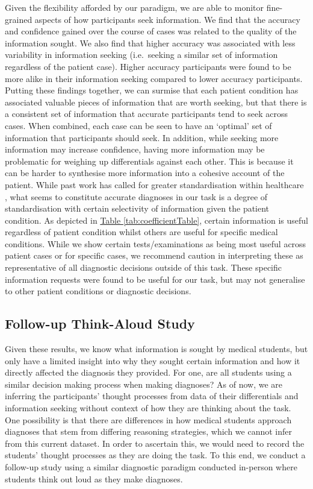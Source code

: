 \documentclass[a4paper, nobind]{templates/ociamthesis}
\begin{document}
Given the flexibility afforded by our paradigm, we are able to monitor fine-grained aspects of how participants seek information. We find that the accuracy and confidence gained over the course of cases was related to the quality of the information sought. We also find that higher accuracy was associated with less variability in information seeking (i.e.~seeking a similar set of information regardless of the patient case). Higher accuracy participants were found to be more alike in their information seeking compared to lower accuracy participants. Putting these findings together, we can surmise that each patient condition has associated valuable pieces of information that are worth seeking, but that there is a consistent set of information that accurate participants tend to seek across cases. When combined, each case can be seen to have an `optimal' set of information that participants should seek. In addition, while seeking more information may increase confidence, having more information may be problematic for weighing up differentials against each other. This is because it can be harder to synthesise more information into a cohesive account of the patient. While past work has called for greater standardisation within healthcare \autocite{wears_standardisation_2015}, what seems to constitute accurate diagnoses in our task is a degree of standardisation with certain selectivity of information given the patient condition. As depicted in \hyperref[tab:coefficientTable]{Table \ref{tab:coefficientTable}}, certain information is useful regardless of patient condition whilst others are useful for specific medical conditions. While we show certain tests/examinations as being most useful across patient cases or for specific cases, we recommend caution in interpreting these as representative of all diagnostic decisions outside of this task. These specific information requests were found to be useful for our task, but may not generalise to other patient conditions or diagnostic decisions.

\subsection{Follow-up Think-Aloud Study}\label{follow-up-think-aloud-study}

Given these results, we know what information is sought by medical students, but only have a limited insight into why they sought certain information and how it directly affected the diagnosis they provided. For one, are all students using a similar decision making process when making diagnoses? As of now, we are inferring the participants' thought processes from data of their differentials and information seeking without context of how they are thinking about the task. One possibility is that there are differences in how medical students approach diagnoses that stem from differing reasoning strategies, which we cannot infer from this current dataset. In order to ascertain this, we would need to record the students' thought processes as they are doing the task. To this end, we conduct a follow-up study using a similar diagnostic paradigm conducted in-person where students think out loud as they make diagnoses.
\end{document}
